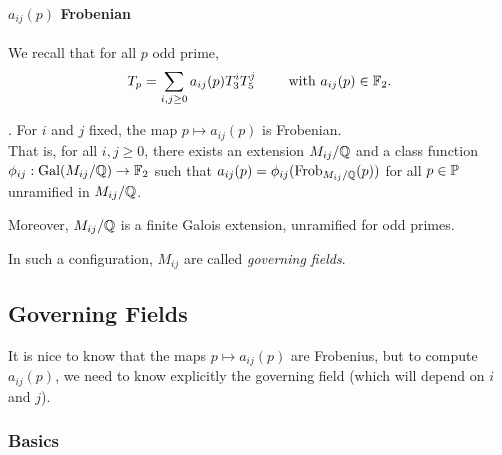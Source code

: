 \paragraph{$a_{ij}(p)$ Frobenian}

We recall that for all $p$ odd prime, 
$$
T_p = \sum_{i,j \geq 0} a_{ij}(p)T_3^iT_5^j
\qquad \text{ with } a_{ij}(p) \in \mathbb{F}_2.
$$
\begin{theorem}\cite[§7]{StructureAlgebreHecke}.
	For $i$ and $j$ fixed, the map $p \mapsto a_{ij}(p)$ is Frobenian.\\
	That is, for all $i,j \geq 0$, there exists an extension $M_{ij}/\mathbb{Q}$ and a class function $\phi_{ij}: \text{Gal}(M_{ij}/\mathbb{Q}) \to \mathbb{F}_2$ such that $a_{ij}(p)=\phi_{ij}(\text{Frob}_{M_{ij}/\mathbb{Q}}(p))$ for all $p \in \mathbb{P}$ unramified in $M_{ij}/\mathbb{Q}$.
	
	Moreover, $M_{ij}/\mathbb{Q}$ is a finite Galois extension, unramified for odd primes.
\end{theorem}
In such a configuration, $M_{ij}$ are called \textit{governing fields}.

%
%
%


\subsection{Governing Fields}
It is nice to know that the maps $p \mapsto a_{ij}(p)$ are Frobenius, but to compute $a_{ij}(p)$, we need to know explicitly the governing field (which will depend on $i$ and $j$).
\subsubsection{Basics}
